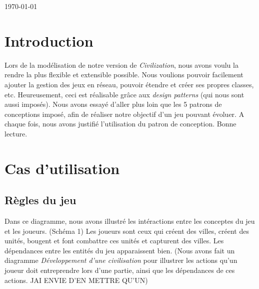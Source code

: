 \begin{titlepage}

{\large \today}\\[3cm] %


 

\vfill %

\end{titlepage}

\tableofcontent

\section{Introduction}

	Lors de la modélisation de notre version de \textit{Civilization}, nous avons voulu la rendre la plus flexible et extensible possible.
Nous voulions pouvoir facilement ajouter la gestion des jeux en réseau, pouvoir étendre et créer ses propres classes, etc.
Heureusement, ceci est réalisable grâce aux \textit{design patterns} (qui nous sont aussi imposés).
Nous avons essayé d'aller plus loin que les 5 patrons de conceptions imposé, afin de réaliser notre objectif d'un jeu pouvant évoluer.
A chaque fois, nous avons justifié l'utilisation du patron de conception.
	Bonne lecture.

\section{Cas d'utilisation}
	\subsection{Règles du jeu}
		Dans ce diagramme, nous avons illustré les intéractions entre les conceptes du jeu et les joueurs. (Schéma 1)
	Les joueurs sont ceux qui créent des villes, créent des unités, bougent et font combattre ces unités et capturent des villes.
	Les dépendances entre les entités du jeu apparaissent bien.
	(Nous avons fait un diagramme \textit{Développement d'une civilisation} pour illustrer les actions qu'un joueur doit entreprendre lors d'une partie,
	ainsi que les dépendances de ces actions. JAI ENVIE D'EN METTRE QU'UN)
	

